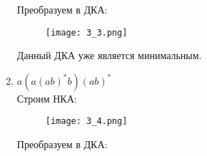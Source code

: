 \documentclass[12pt, a4paper]{article}
\begin{document}
\begin{enumerate}
Преобразуем в ДКА:

\begin{comment}
digraph {
    rankdir="LR"
    "" [shape=point]
    "{q1q2q5q9}" [shape=circle]
    "{q3,q7,q10}" [shape=doublecircle]
    "{q4q8}" [shape=circle]
    "{q3,q7,q9,q10}" [shape=doublecircle]

    "" -> "{q1q2q5q9}"
    "{q1q2q5q9}" -> "{q3,q7,q10}" [label="a"]
    "{q3,q7,q10}" -> "{q4q8}" [label="b"]
    "{q4q8}" -> "{q3,q7,q9,q10}" [label="a"]
    "{q3,q7,q9,q10}" -> "{q4q8}" [label="b"]
    "{q3,q7,q9,q10}" -> "{q3,q7,q10}" [label="a"]
}
\end{comment}
    \begin{figure}[H]
        \centering
        \texttt{[image: 3\_3.png]}
    \end{figure}
    
Данный ДКА уже является минимальным.

    \item \(a(a(ab)^*b)(ab)^*\)
\\Строим НКА:
\begin{comment}
digraph {
    rankdir="LR"
    "" [shape=point]
    q1 [shape=circle]
    q2 [shape=circle]
    q3 [shape=circle]
    q4 [shape=circle]
    q5 [shape=circle]
    q6 [shape=doublecircle]
    q7 [shape=circle]
    q8 [shape=doublecircle]

    "" -> q1
    q1 -> q2 [label="a"]
    q1 -> q8 [label="a"]
    q2 -> q3 [label="a"]
    q3 -> q4 [label="a"]
    q3 -> q6 [label="b"]
    q4 -> q5 [label="b"]
    q5 -> q4 [label="a"]
    q5 -> q6 [label="b"]
    q6 -> q7 [label="a"]
    q7 -> q8 [label="b"]
    q8 -> q7 [label="a"]
}
\end{comment}

    \begin{figure}[H]
        \centering
        \texttt{[image: 3\_4.png]}
    \end{figure}
    
Преобразуем в ДКА:

\begin{comment}
digraph {
    rankdir="LR"
    "" [shape=point]
    q1 [shape=circle]
    "{q2q8}" [shape=doublecircle]
    "{q3q7}" [shape=circle]
    "{q6q8}" [shape=doublecircle]
    q4 [shape=circle]
    q5 [shape=circle]
    q6 [shape=doublecircle]

    "" -> q1
    q1 -> "{q2q8}" [label="a"]
    "{q2q8}" -> "{q3q7}" [label="a"]
    "{q3q7}" -> q4 [label="a"]
    "{q3q7}" -> "{q6q8}" [label="b"]
    q4 -> q5 [label="b"]
    q5 -> q4 [label="a"]
    q5 -> q6 [label="b"]
    q6 -> "{q3q7}" [label="a"]
    "{q3q7}" -> "{q6q8}" [label="b"]
    "{q6q8}" -> "{q3q7}"
}
\end{comment}


\end{enumerate}
\end{document}
